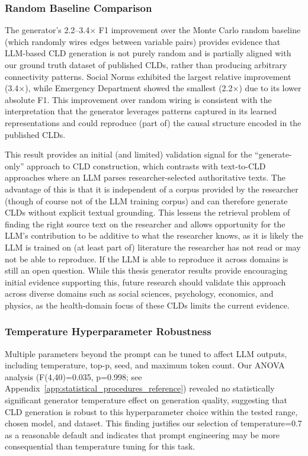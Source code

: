\subsubsection{Random Baseline Comparison}

The generator's 2.2--3.4$\times$ F1 improvement over the Monte Carlo random baseline (which randomly wires edges between variable pairs) provides evidence that LLM-based CLD generation is not purely random and is partially aligned with our ground truth dataset of published CLDs, rather than producing arbitrary connectivity patterns. Social Norms exhibited the largest relative improvement (3.4$\times$), while Emergency Department showed the smallest (2.2$\times$) due to its lower absolute F1. This improvement over random wiring is consistent with the interpretation that the generator leverages patterns captured in its learned representations and could reproduce (part of) the causal structure encoded in the published CLDs.

This result provides an initial (and limited) validation signal for the ``generate-only'' approach to CLD construction, which contrasts with text-to-CLD approaches where an LLM parses researcher-selected authoritative texts. The advantage of this is that it is independent of a corpus provided by the researcher (though of course not of the LLM training corpus) and can therefore generate CLDs without explicit textual grounding. This lessens the retrieval problem of finding the right source text on the researcher and allows opportunity for the LLM's contribution to be additive to what the researcher knows, as it is likely the LLM is trained on (at least part of) literature the researcher has not read or may not be able to reproduce. If the LLM is able to reproduce it across domains is still an open question. While this thesis generator results provide encouraging initial evidence supporting this, future research should validate this approach across diverse domains such as social sciences, psychology, economics, and physics, as the health-domain focus of these CLDs limits the current evidence.

\subsubsection{Temperature Hyperparameter Robustness}

Multiple parameters beyond the prompt can be tuned to affect LLM outputs, including temperature, top-p, seed, and maximum token count. Our ANOVA analysis (F(4,40)=0.035, p=0.998; see Appendix~\ref{app:statistical_procedures_reference}) revealed no statistically significant generator temperature effect on generation quality, suggesting that CLD generation is robust to this hyperparameter choice within the tested range, chosen model, and dataset. This finding justifies our selection of temperature=0.7 as a reasonable default and indicates that prompt engineering may be more consequential than temperature tuning for this task.

